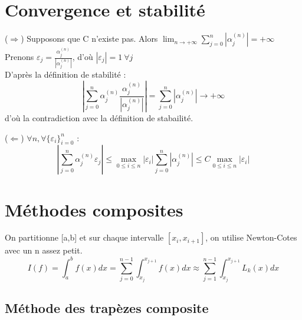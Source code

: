 \section{Convergence et stabilité}



\begin{dem}
	($\Rightarrow$) Supposons que C n'existe pas. Alors $\lim_{n\to+\infty} \sum_{j=0}^n |\alpha_j^{(n)}| =+\infty$\\
	Prenons $\varepsilon_j=\frac{\alpha_j^{(n)}}{|\alpha_j^{(n)}|}$, d'où $|\varepsilon_j|=1\ \forall j$\\
	D'après la définition de stabilité :
	\[\left|\sum_{j=0}^n \alpha_j^{(n)} \frac{\alpha_j^{(n)}}{|\alpha_j^{(n)}|}\right|=\sum_{j=0}^n |\alpha_j^{(n)}| \to+\infty\]
	d'où la contradiction avec la définition de stabailité.

	\bigskip
	($\Leftarrow$) $\forall n, \forall\{\varepsilon_i\}_{i=0}^n$ : 
	\[\left|\sum_{j=0}^n \alpha_j^{(n)} \varepsilon_j\right|\leq \max_{0\leq i\leq n} |\varepsilon_i| \sum_{j=0}^n|\alpha_j^{(n)}|\leq C\max_{0\leq i\leq n}|\varepsilon_i|\]
\end{dem}


\section{Méthodes composites}
On partitionne [a,b] et sur chaque intervalle $[x_i,x_{i+1}]$, on utilise Newton-Cotes avec un n assez petit.
\[I(f)=\int_a^b f(x)dx = \sum_{j=0}^{n-1} \int_{x_j}^{x_{j+1}} f(x)dx \approx \sum_{j=1}^{n-1} \int_{x_j}^{x_{j+1}} L_k(x)dx\]

\subsection{Méthode des trapèzes composite}

